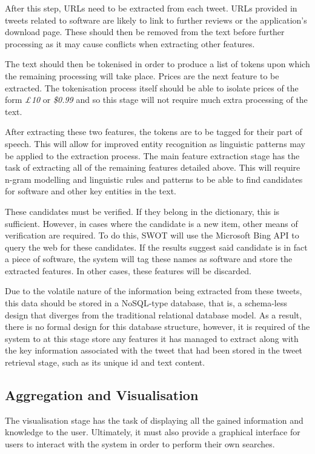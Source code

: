 After this step, URLs need to be extracted from each tweet. URLs provided in tweets related to software are likely to link to further reviews or the application's download page. These should then be removed from the text before further processing as it may cause conflicts when extracting other features.

The text should then be tokenised in order to produce a list of tokens upon which the remaining processing will take place. Prices are the next feature to be extracted. The tokenisation process itself should be able to isolate prices of the form \emph{£10} or \emph{\$0.99} and so this stage will not require much extra processing of the text.

After extracting these two features, the tokens are to be tagged for their part of speech. This will allow for improved entity recognition as linguistic patterns may be applied to the extraction process. The main feature extraction stage has the task of extracting all of the remaining features detailed above. This will require n-gram modelling and linguistic rules and patterns to be able to find candidates for software and other key entities in the text.

These candidates must be verified. If they belong in the dictionary, this is sufficient. However, in cases where the candidate is a new item, other means of verification are required. To do this, SWOT will use the Microsoft Bing API to query the web for these candidates. If the results suggest said candidate is in fact a piece of software, the system will tag these names as software and store the extracted features. In other cases, these features will be discarded.

Due to the volatile nature of the information being extracted from these tweets, this data should be stored in a NoSQL-type database, that is, a schema-less design that diverges from the traditional relational database model. As a result, there is no formal design for this database structure, however, it is required of the system to at this stage store any features it has managed to extract along with the key information associated with the tweet that had been stored in the tweet retrieval stage, such as its unique id and text content.

\subsection{Aggregation and Visualisation}
\label{sec:arc3}
The visualisation stage has the task of displaying all the gained information and knowledge to the user. Ultimately, it must also provide a graphical interface for users to interact with the system in order to perform their own searches.

